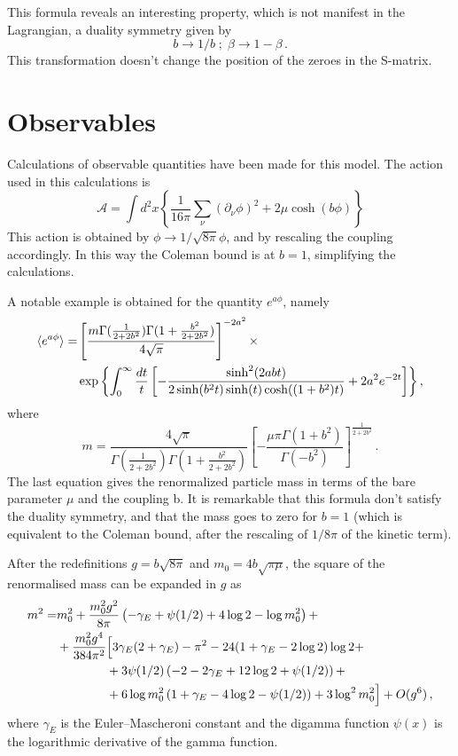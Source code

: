 \documentclass[12pt,a4paper]{report}
\begin{document}
This formula reveals an interesting property, which is not manifest in the Lagrangian, a duality symmetry given by \begin{equation}
b \to 1/b \; ; \; \beta \to 1- \beta \,.
\end{equation} This transformation doesn't change the position of the zeroes in the S-matrix.


\section{Observables}
Calculations of observable quantities have been made for this model. 
The action used in this calculations is \begin{equation}
\mathcal{A} = \int d^2x  \left\lbrace\dfrac{1}{16 \pi} \sum_\nu (\partial_\nu \phi )^2 + 2 \mu \cosh(b \phi) \right\rbrace 
\end{equation} This action is obtained by $\phi \to 1/ \sqrt{8 \pi} \phi$,
   and by rescaling the coupling accordingly. In this way the Coleman bound is at $b=1$, simplifying the calculations. 
   
   A notable example is obtained for the quantity $e^{a\phi}$, namely
\begin{align}
\braket{e^{a \phi}} =  &\left[ \dfrac{m\Gamma(\frac{1}{2+2b^2}) \Gamma(1+ \frac{b^2}{2+2b^2}) }{4 \sqrt{\pi}}  \right]^{-2 a^2} \times  \\ & \exp{\left\lbrace \int_0^\infty \dfrac{dt}{t} \left[ - \dfrac{\sinh^2(2 a b t)}{2 \sinh(b^2t) \sinh(t)\cosh((1+b^2)t) } + 2 a^2 e^{-2t} \right]  \right\rbrace } \nonumber \,,
\end{align} where \begin{equation}
\label{eq:mass_continuum}
m = \dfrac{4 \sqrt{\pi}}{\Gamma(\frac{1}{2+2b^2})\Gamma(1 +\frac{b^2}{2+2b^2}) } \left[ - \dfrac{\mu \pi \Gamma(1+b^2)}{\Gamma(-b^2)} \right]^{\frac{1}{2+2b^2}} \,.
\end{equation} The last equation gives the renormalized particle mass in terms of the bare parameter $\mu$ and the coupling b. It is remarkable that this formula don't satisfy the duality symmetry, and that the mass goes to zero for $b=1$ (which is equivalent to the Coleman bound, after the rescaling of $1/8\pi$ of the kinetic term).

After the redefinitions $g=b\sqrt{8\pi}$ and $m_0=4b\sqrt{\pi\mu}$, the square of the renormalised mass can be expanded in $g$ as
\begin{align}
\label{eq:exactrenormalisedmassexpansion}
m^2=&m_0^2+\frac{m_0^2g^2}{8\pi}\left(
-\gamma_E+\psi(1/2) +4 \log 2-\log m_0^2
\right)+\notag\\
&+\frac{m_0^2g^4}{384\pi^2}\Big[
3\gamma_E(2+\gamma_E)-\pi^2-24(1+\gamma_E-2\log 2)\log 2+\notag\\
&\qquad\qquad+3\psi(1/2)\left(-2-2\gamma_E+12\log 2+\psi(1/2)\right)+\notag\\
&\qquad\qquad+6\log m_0^2\left(1+\gamma_E-4\log 2-\psi(1/2)\right)+3\log^2m_0^2
\Big]+O(g^6)\,,
\end{align}
where $\gamma_E$ is the Euler–Mascheroni constant and the digamma function $\psi(x)$ is the logarithmic derivative of the gamma function.
\end{document}
